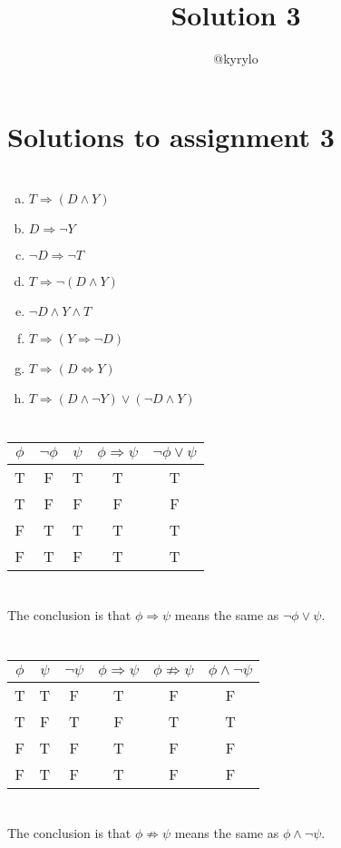 \documentclass{article}
\title{Solution 3}
\author{@kyrylo}
\begin{document}
\section*{Solutions to assignment 3}

\section{}

\begin{enumerate}[(a)]
\item $T \Rightarrow (D \wedge Y)$
\item $D \Rightarrow \neg Y$
\item $\neg D \Rightarrow \neg T$
\item $T \Rightarrow \neg (D \wedge Y)$
\item $\neg D \wedge Y \wedge T$
\item $T \Rightarrow (Y \Rightarrow \neg D)$
\item $T \Rightarrow (D \Leftrightarrow Y)$
\item $T \Rightarrow (D \wedge \neg Y) \vee (\neg D \wedge Y)$
\end{enumerate}

\section{}

\begin{tabular}{ | c | c | c | c | c | }
  \hline
  $\phi$ & $\neg \phi$ & $\psi$ & $\phi \Rightarrow \psi$ & $\neg \phi \vee \psi$ \\
  \hline
  T & F & T & T & T \\
  T & F & F & F & F \\
  F & T & T & T & T \\
  F & T & F & T & T \\
  \hline
\end{tabular}

\section{}

The conclusion is that $\phi \Rightarrow \psi$ means the same as $\neg \phi \vee \psi$.

\section{}

\begin{tabular}{ | c | c | c | c | c | c | }
  \hline
  $\phi$ & $\psi$ & $\neg \psi$ & $\phi \Rightarrow \psi$ & $\phi \not \Rightarrow \psi$ & $\phi \wedge \neg \psi$ \\
  \hline
  T & T & F & T & F & F \\
  T & F & T & F & T & T \\
  F & T & F & T & F & F \\
  F & T & F & T & F & F \\
  \hline
\end{tabular}

\section{}

The conclusion is that $\phi \not \Rightarrow \psi$  means the same as $\phi \wedge \neg \psi$.
\end{document}
